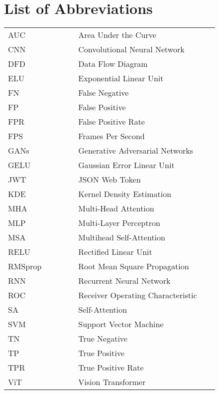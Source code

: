 \section*{List of Abbreviations}
\begin{table}[h]

    \renewcommand{\arraystretch}{1.5}
    \begin{tabular}{@{}p{0.3\linewidth}p{0.6\linewidth}@{}}
        AUC     & Area Under the Curve              \\
        CNN     & Convolutional Neural Network      \\
        DFD     & Data Flow Diagram                 \\
        ELU     & Exponential Linear Unit           \\
        FN      & False Negative                    \\
        FP      & False Positive                    \\
        FPR     & False Positive Rate               \\
        FPS     & Frames Per Second                 \\
        GANs    & Generative Adversarial Networks   \\
        GELU    & Gaussian Error Linear Unit        \\
        JWT     & JSON Web Token                    \\
        KDE     & Kernel Density Estimation         \\
        MHA     & Multi-Head Attention              \\
        MLP     & Multi-Layer Perceptron            \\
        MSA     & Multihead Self-Attention          \\
        RELU    & Rectified Linear Unit             \\
        RMSprop & Root Mean Square Propagation      \\
        RNN     & Recurrent Neural Network          \\
        ROC     & Receiver Operating Characteristic \\
        SA      & Self-Attention                    \\
        SVM     & Support Vector Machine            \\
        TN      & True Negative                     \\
        TP      & True Positive                     \\
        TPR     & True Positive Rate                \\
        ViT     & Vision Transformer                \\
    \end{tabular}
\end{table}